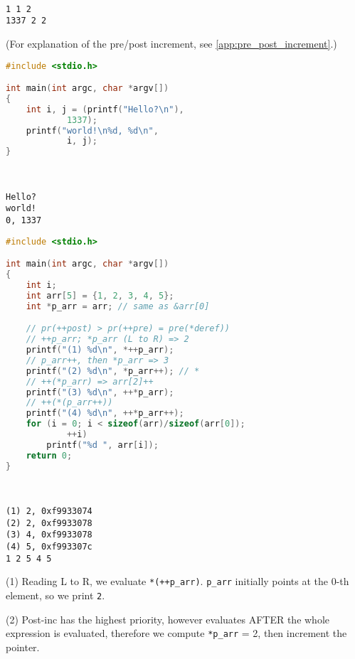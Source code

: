 \begin{exmp}
\begin{multicols}{2}
\columnbreak
\; \\
\begin{verbatim}
1 1 2
1337 2 2
\end{verbatim}
(For explanation of the pre/post increment, see \ref{app:pre_post_increment}.)

\end{multicols}


\begin{multicols}{2}
\begin{lstlisting}[language=c]
#include <stdio.h>

int main(int argc, char *argv[])
{
	int i, j = (printf("Hello?\n"),
			1337);
	printf("world!\n%d, %d\n",
			i, j);
}
\end{lstlisting}
\columnbreak
\; \\
\begin{verbatim}
Hello?
world!
0, 1337
\end{verbatim}
\end{multicols}


\begin{multicols}{2}
\begin{lstlisting}[language=c]
#include <stdio.h>

int main(int argc, char *argv[])
{
	int i;
	int arr[5] = {1, 2, 3, 4, 5};
	int *p_arr = arr; // same as &arr[0]

	// pr(++post) > pr(++pre) = pre(*deref))
	// ++p_arr; *p_arr (L to R) => 2
	printf("(1) %d\n", *++p_arr);
	// p_arr++, then *p_arr => 3
	printf("(2) %d\n", *p_arr++); // *
	// ++(*p_arr) => arr[2]++
	printf("(3) %d\n", ++*p_arr);
	// ++(*(p_arr++))
	printf("(4) %d\n", ++*p_arr++);
	for (i = 0; i < sizeof(arr)/sizeof(arr[0]);
			++i)
		printf("%d ", arr[i]);
	return 0;
}
\end{lstlisting}

\columnbreak
\; \\
\begin{verbatim}
(1) 2, 0xf9933074
(2) 2, 0xf9933078
(3) 4, 0xf9933078
(4) 5, 0xf993307c
1 2 5 4 5
\end{verbatim}

(1) Reading L to R, we evaluate \texttt{*(++p\_arr)}. \texttt{p\_arr} initially points at the 0-th element, so we print \texttt{2}.

(2) Post-inc has the highest priority, however evaluates AFTER the whole expression is evaluated, therefore we compute \texttt{*p\_arr} = 2, then increment the pointer.


\end{multicols}
\end{exmp}
